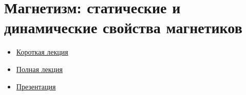 \documentclass[a4paper]{article}
\begin{document}
\section{Магнетизм: статические и динамические свойства магнетиков}
\begin{multicols}{2}
\begin{itemize}
\item 
\href{run:./lec-text/13-magnets-2021_min_may01.pdf}{Короткая лекция}
\item 
\href{run:./lec-text/13-magnets-2021_apr25.pdf}{Полная лекция}
\item 
\href{run:./lec-pres/13-slides-2021.pdf.pdf}{Презентация}
\end{itemize}
\end{multicols}
\end{document}
